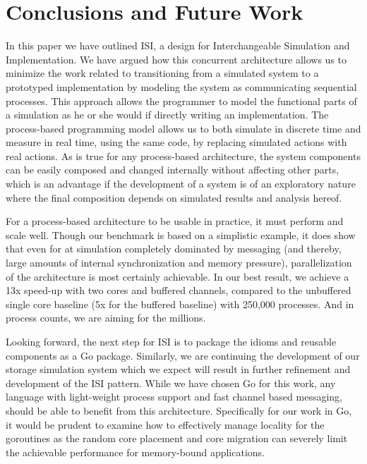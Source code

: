 \section{Conclusions and Future Work}
In this paper we have outlined ISI, a design for Interchangeable Simulation and
Implementation. We have argued how this concurrent architecture allows us to
minimize the work related to transitioning from a simulated system to a prototyped
implementation by modeling the system as communicating sequential processes.
This approach allows the programmer to model the functional parts of a
simulation as he or she would if directly writing an implementation. The
process-based programming model allows us to both simulate in discrete time and
measure in real time, using the same code, by replacing simulated actions with
real actions. As is true for any process-based architecture, the system
components can be easily composed and changed internally without affecting
other parts, which is an advantage if the development of a system is of an
exploratory nature where the final composition depends on simulated results and
analysis hereof.

For a process-based architecture to be usable in practice, it must perform and
scale well. Though our benchmark is based on a simplistic example, it does
show that even for at simulation completely dominated by messaging (and
thereby, large amounts of internal synchronization and memory pressure),
parallelization of the architecture is most certainly achievable. In our best
result, we achieve a 13x speed-up with two cores and buffered channels,
compared to the unbuffered single core baseline (5x for the buffered baseline)
with 250,000 processes. And in process counts, we are aiming for the millions.

Looking forward, the next step for ISI is to package the idioms and reusable
components as a Go package. Similarly, we are continuing the development of our
storage simulation system which we expect will result in further refinement and
development of the ISI pattern. While we have chosen Go for this work, any
language with light-weight process support and fast channel based messaging,
should be able to benefit from this architecture. Specifically for our work in
Go, it would be prudent to examine how to effectively manage locality for the
goroutines as the random core placement and core migration can severely limit
the achievable performance for memory-bound applications.
